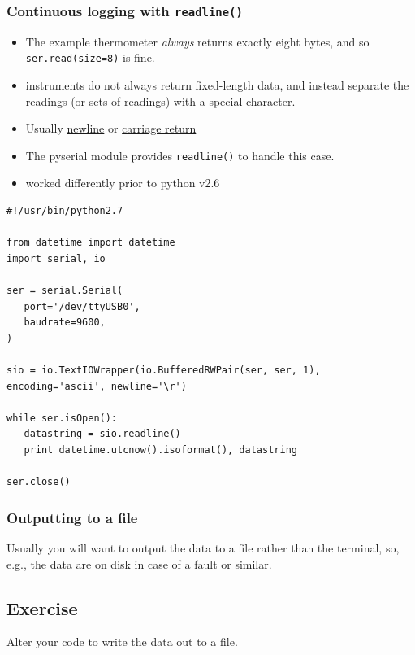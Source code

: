 \documentclass[aspectratio=1610,9pt]{beamer} %
\begin{document}
\begin{frame}[fragile]
\frametitle{Continuous logging with \texttt{readline()}}

\begin{itemize}
\itemsep1pt\parskip0pt
\item
  The example thermometer \emph{always} returns exactly eight bytes, and
  so \texttt{ser.read(size=8)} is fine.
\item
  instruments do not always return fixed-length data, and instead
  separate the readings (or sets of readings) with a special character.
\item
  Usually \href{http://en.wikipedia.org/wiki/Newline}{newline} or
  \href{http://en.wikipedia.org/wiki/Carriage_return}{carriage return}
\item
  The pyserial module provides \texttt{readline()} to handle this case.
\item
  worked differently prior to python v2.6
\end{itemize}
\end{frame}
\begin{frame}[fragile]

\begin{verbatim}
#!/usr/bin/python2.7

from datetime import datetime
import serial, io

ser = serial.Serial(
   port='/dev/ttyUSB0',
   baudrate=9600,
)

sio = io.TextIOWrapper(io.BufferedRWPair(ser, ser, 1), encoding='ascii', newline='\r')

while ser.isOpen():
   datastring = sio.readline()
   print datetime.utcnow().isoformat(), datastring

ser.close()
\end{verbatim}

\end{frame}
\begin{frame}
\frametitle{Outputting to a file}

Usually you will want to output the data to a file rather than the
terminal, so, e.g., the data are on disk in case of a fault or similar.

\subsection{Exercise}

Alter your code to write the data out to a file.

\end{frame}
\end{document}
